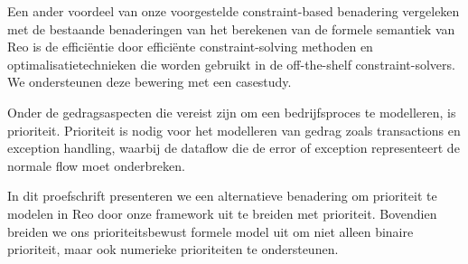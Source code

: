 Een ander voordeel van onze voorgestelde constraint-based benadering vergeleken met de bestaande benaderingen van het berekenen van de formele semantiek van Reo is de efficiëntie door efficiënte constraint-solving methoden en optimalisatietechnieken die worden gebruikt in de off-the-shelf constraint-solvers. We ondersteunen deze bewering met een casestudy. 

Onder de gedragsaspecten die vereist zijn om een bedrijfsproces te modelleren, is prioriteit. Prioriteit is nodig voor het modelleren van gedrag zoals transactions en exception handling, waarbij de dataflow die de error of exception representeert de normale flow moet onderbreken. 

In dit proefschrift presenteren we een alternatieve benadering om prioriteit te modelen in Reo door onze framework uit te breiden met prioriteit. Bovendien breiden we ons prioriteitsbewust formele model uit om niet alleen binaire prioriteit, maar ook numerieke prioriteiten te ondersteunen.

